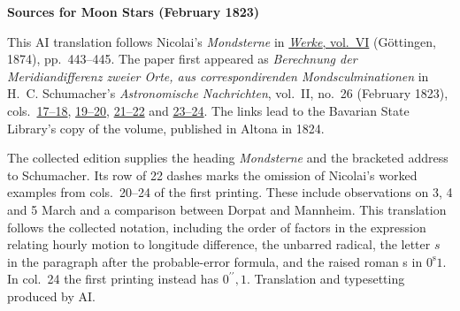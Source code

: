 \clearpage\thispagestyle{empty}
\begin{center}\textbf{Sources for Moon Stars (February 1823)}\end{center}
\noindent This AI translation follows Nicolai’s \textit{Mondsterne} in \href{https://gdz.sub.uni-goettingen.de/id/PPN236007467}{\textit{Werke}, vol.~VI} (Göttingen, 1874), pp.~443--445. The paper first appeared as \textit{Berechnung der Meridiandifferenz zweier Orte, aus correspondirenden Mondsculminationen} in H.~C. Schumacher’s \textit{Astronomische Nachrichten}, vol.~II, no.~26 (February 1823), cols.~\href{https://api.digitale-sammlungen.de/iiif/image/v2/bsb10049427_00021/full/1800,/0/default.jpg}{17--18}, \href{https://api.digitale-sammlungen.de/iiif/image/v2/bsb10049427_00022/full/1800,/0/default.jpg}{19--20}, \href{https://api.digitale-sammlungen.de/iiif/image/v2/bsb10049427_00025/full/1800,/0/default.jpg}{21--22} and \href{https://api.digitale-sammlungen.de/iiif/image/v2/bsb10049427_00026/full/1800,/0/default.jpg}{23--24}. The links lead to the Bavarian State Library’s copy of the volume, published in Altona in 1824.
\par\smallskip\noindent The collected edition supplies the heading \textit{Mondsterne} and the bracketed address to Schumacher. Its row of 22 dashes marks the omission of Nicolai’s worked examples from cols.~20--24 of the first printing. These include observations on 3, 4 and 5 March and a comparison between Dorpat and Mannheim. This translation follows the collected notation, including the order of factors in the expression relating hourly motion to longitude difference, the unbarred radical, the letter $s$ in the paragraph after the probable-error formula, and the raised roman s in $0^{\mathrm{s}}1$. In col.~24 the first printing instead has $0^{\prime\prime}{,}1$. Translation and typesetting produced by AI.
\clearpage
